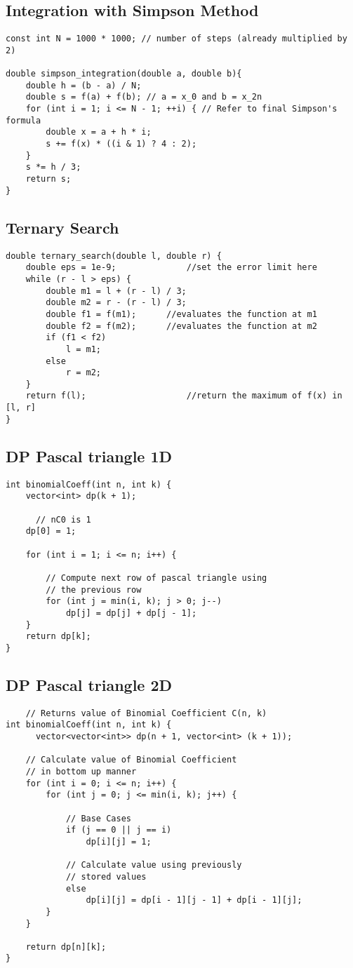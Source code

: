 \documentclass{article}
\begin{document}
\subsection{Integration with Simpson Method}
\begin{lstlisting}
const int N = 1000 * 1000; // number of steps (already multiplied by 2)

double simpson_integration(double a, double b){
    double h = (b - a) / N;
    double s = f(a) + f(b); // a = x_0 and b = x_2n
    for (int i = 1; i <= N - 1; ++i) { // Refer to final Simpson's formula
        double x = a + h * i;
        s += f(x) * ((i & 1) ? 4 : 2);
    }
    s *= h / 3;
    return s;
}
\end{lstlisting}
\subsection{Ternary Search}
\begin{lstlisting}
double ternary_search(double l, double r) {
    double eps = 1e-9;              //set the error limit here
    while (r - l > eps) {
        double m1 = l + (r - l) / 3;
        double m2 = r - (r - l) / 3;
        double f1 = f(m1);      //evaluates the function at m1
        double f2 = f(m2);      //evaluates the function at m2
        if (f1 < f2)
            l = m1;
        else
            r = m2;
    }
    return f(l);                    //return the maximum of f(x) in [l, r]
}
\end{lstlisting}
\subsection{DP Pascal triangle 1D}
\begin{lstlisting}
int binomialCoeff(int n, int k) {
    vector<int> dp(k + 1);

      // nC0 is 1
    dp[0] = 1; 

    for (int i = 1; i <= n; i++) {
      
        // Compute next row of pascal triangle using
        // the previous row
        for (int j = min(i, k); j > 0; j--)
            dp[j] = dp[j] + dp[j - 1];
    }
    return dp[k];
}
\end{lstlisting}
\subsection{DP Pascal triangle 2D}
\begin{lstlisting}
    // Returns value of Binomial Coefficient C(n, k)
int binomialCoeff(int n, int k) {
      vector<vector<int>> dp(n + 1, vector<int> (k + 1));
  
    // Calculate value of Binomial Coefficient
    // in bottom up manner
    for (int i = 0; i <= n; i++) {
        for (int j = 0; j <= min(i, k); j++) {
          
            // Base Cases
            if (j == 0 || j == i)
                dp[i][j] = 1;

            // Calculate value using previously
            // stored values
            else
                dp[i][j] = dp[i - 1][j - 1] + dp[i - 1][j];
        }
    }

    return dp[n][k];
}
\end{lstlisting}
\end{document}

